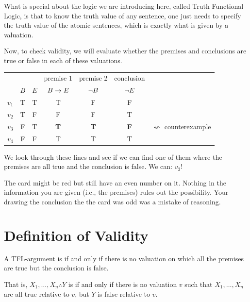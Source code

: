 What is special about the logic we are introducing here, called Truth Functional Logic, is that to know the truth value of any sentence, one just needs to specify the truth value of the atomic sentences, which is exactly what is given by a valuation. 

Now, to check validity, we will evaluate whether the premises and conclusions are true or false in each of these valuations.

\begin{center}
	\begin{tabular}{rcc|c|c|cr}
		&&&premise 1&premise 2&conclusion\\
		&$B$&$E$&$B\rightarrow E$&$\neg B$&$\neg E$\\\hline
		$v_1$&T&T&T&F&F\\
		$v_2$&T&F&F&F&T\\
		$v_3$&F&T&\textbf{T}&\textbf{T}&\textbf{F}&$\leftsquigarrow$ counterexample\\
		$v_4$&F&F&T&T&T\\
	\end{tabular}
\end{center}

We look through these lines and see if we can find one of them where the premises are all true and the conclusion is false. We can: $v_3$!

The card might be red but still have an even number on it. Nothing in the information you are given (i.e., the premises) rules out the possibility. Your drawing the conclusion the the card was odd was a mistake of reasoning. 

\section{Definition of Validity}

\begin{definition}\label{def:TFLvalid}A TFL-argument is  if and only if there is no valuation on which all the premises are true but the conclusion is false. 
	
	\medskip 
	That is, $X_1,\ldots,X_n\therefore Y$ is  if and only if there is no valuation $v$ such that $X_1,\ldots,X_n$ are all true relative to $v$, but $Y$ is false relative to $v$.\end{definition}
	
	
	
